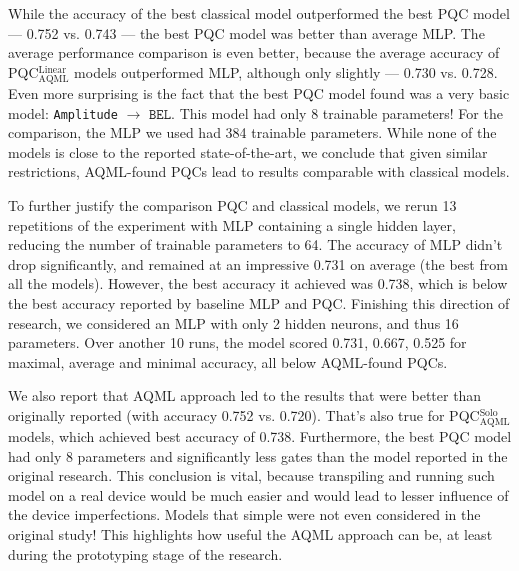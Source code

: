 \documentclass[runningheads]{llncs}
\begin{document}
While the accuracy of the best classical model outperformed the best PQC model --- 0.752 vs. 0.743 --- the best PQC
model was better than average MLP. The average performance comparison is even better, because the average accuracy
of PQC$^{\mathrm{Linear}}_{\mathrm{AQML}}$ models outperformed MLP, although only slightly  --- 0.730 vs. 0.728. Even
more surprising is the fact that the best PQC model found was a very basic model: \texttt{Amplitude} $\to$
$\texttt{BEL}$. This model had only 8 trainable parameters! For the comparison, the MLP we used had 384 trainable
parameters. While none of the models is close to the reported state-of-the-art, we conclude that given similar
restrictions, AQML-found PQCs lead to results comparable with classical models.

To further justify the comparison PQC and classical models, we rerun 13 repetitions of the experiment with MLP
containing a single hidden layer, reducing the number of trainable parameters to 64. The accuracy of MLP didn't
drop significantly, and remained at an impressive 0.731 on average (the best from all the models). However, the best
accuracy it achieved was 0.738, which is below the best accuracy reported by baseline MLP and PQC. Finishing this
direction of research, we considered an MLP with only 2 hidden neurons, and thus 16 parameters. Over another 10 runs,
the model scored 0.731, 0.667, 0.525 for maximal, average and minimal accuracy, all below AQML-found PQCs.

We also report that AQML approach led to the results that were better than originally reported (with accuracy
0.752 vs. 0.720). That's also true for PQC$^{\mathrm{Solo}}_{\mathrm{AQML}}$ models, which achieved best accuracy of
0.738. Furthermore, the best PQC model had only 8 parameters and significantly less gates than the model reported
in the original research. This conclusion is vital, because transpiling and running such model on a real device would
be much easier and would lead to lesser influence of the device imperfections. Models that simple were not even considered
in the original study! This highlights how useful the AQML approach can be, at least during the prototyping stage of the research.
\end{document}
